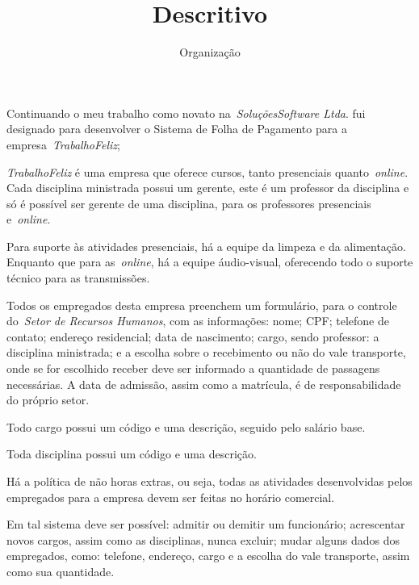 \documentclass [12pt]{article}
\title {Descritivo}
\subtitle {Organização}
\begin{document}
	\inserirTitulo

	Continuando o meu trabalho como novato na~\textit{SoluçõesSoftware Ltda}. fui designado para desenvolver o Sistema de Folha de Pagamento para a empresa~\textit{TrabalhoFeliz};
	
	\textit{TrabalhoFeliz} é uma empresa que oferece cursos, tanto presenciais quanto~\textit{online}. Cada disciplina ministrada possui um gerente, este é um professor da disciplina e só é possível ser gerente de uma disciplina, para os professores presenciais e~\textit{online}.
	
	Para suporte às atividades presenciais, há a equipe da limpeza e da alimentação. Enquanto que para as~\textit{online}, há a equipe áudio-visual, oferecendo todo o suporte técnico para as transmissões.

	Todos os empregados desta empresa preenchem um formulário, para o controle do~\textit{Setor de Recursos Humanos}, com as informações: nome; CPF; telefone de contato; endereço residencial; data de nascimento; cargo, sendo professor: a disciplina ministrada; e a escolha sobre o recebimento ou não do vale transporte, onde se for escolhido receber deve ser informado a quantidade de passagens necessárias. A data de admissão, assim como a matrícula, é de responsabilidade do próprio setor.
	
	Todo cargo possui um código e uma descrição, seguido pelo salário base.
	
	Toda disciplina possui um código e uma descrição.
	
	Há a política de não horas extras, ou seja, todas as atividades desenvolvidas pelos empregados para a empresa devem ser feitas no horário comercial.
	
	Em tal sistema deve ser possível: admitir ou demitir um funcionário; acrescentar novos cargos, assim como as disciplinas, nunca excluir; mudar alguns dados dos empregados, como: telefone, endereço, cargo e a escolha do vale transporte, assim como sua quantidade.
	


\end{document}
